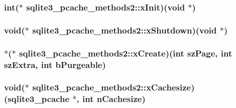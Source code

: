 \hypertarget{structsqlite3__pcache__methods2_8f77114458576c9d75cd53822fcd3462}{
\subsubsection[xInit]{\setlength{\rightskip}{0pt plus 5cm}int($\ast$ {\bf sqlite3\_\-pcache\_\-methods2::xInit})(void $\ast$)}}
\label{structsqlite3__pcache__methods2_8f77114458576c9d75cd53822fcd3462}


\hypertarget{structsqlite3__pcache__methods2_00a780e295b89976940cd3cba2cfeaee}{
\subsubsection[xShutdown]{\setlength{\rightskip}{0pt plus 5cm}void($\ast$ {\bf sqlite3\_\-pcache\_\-methods2::xShutdown})(void $\ast$)}}
\label{structsqlite3__pcache__methods2_00a780e295b89976940cd3cba2cfeaee}


\hypertarget{structsqlite3__pcache__methods2_6a31fcb6e57868bd44d542ef11d55d03}{
\subsubsection[xCreate]{$\ast$($\ast$ {\bf sqlite3\_\-pcache\_\-methods2::xCreate})(int szPage, int szExtra, int bPurgeable)}}
\label{structsqlite3__pcache__methods2_6a31fcb6e57868bd44d542ef11d55d03}


\hypertarget{structsqlite3__pcache__methods2_4889ab0903938f485aa0fa4fc6925d26}{
\subsubsection[xCachesize]{\setlength{\rightskip}{0pt plus 5cm}void($\ast$ {\bf sqlite3\_\-pcache\_\-methods2::xCachesize})({\bf sqlite3\_\-pcache} $\ast$, int nCachesize)}}
\label{structsqlite3__pcache__methods2_4889ab0903938f485aa0fa4fc6925d26}


